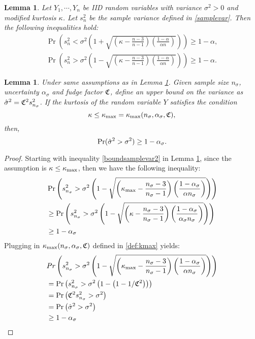 \documentclass{iitthesis}
\newtheorem{lemma}[theorem]{Lemma}
\theoremstyle{definition}
\begin{document}
\begin{lemma}\cite[Lemma 1]{HJLO12} \label{samplevarbound}
Let $Y_1,\cdots,Y_n$ be IID random variables with variance $\sigma^2>0$ and modified kurtosis $\kappa$. Let $s_n^2$ be the sample variance defined in \eqref{samplevar}. Then the following inequalities hold: 
\begin{subequations}
\begin{gather}
\Pr\left( s_n^2 < \sigma^2 \left (1+\sqrt{\left (\kappa-\frac{n-3}{n-1}\right)\left (\frac{1-\alpha}{\alpha n}\right )}\right)\right) \geq 1-\alpha,\label{boundsamplevar1}\\ 
\Pr\left( s_n^2 >\sigma^2 \left (1-\sqrt{\left (\kappa-\frac{n-3}{n-1}\right)\left (\frac{1-\alpha}{\alpha n}\right )}\right)\right) \geq 1-\alpha.\label{boundsamplevar2}
\end{gather}
\end{subequations}

\end{lemma}
\begin{lemma}\label{lowerboundhsigma}
Under same assumptions as in Lemma \ref{samplevarbound}. Given sample size $n_\sigma$, uncertainty $\alpha_\sigma$ and fudge factor $\mathfrak{C}$, define an upper bound on the variance as $\hat{\sigma}^2 = \mathfrak{C}^2 s_{n_{\sigma}}^2$. If the kurtosis of the random variable $Y$ satisfies the condition $$\kappa \leq \kappa_{\max} =\kappa_{\max} (n_\sigma,\alpha_\sigma, \mathfrak{C}),$$ then, $$\Pr (\hat{\sigma}^2 > \sigma^2)\geq 1-\alpha_{\sigma}.$$
\end{lemma}
\begin{proof}
Starting with inequality \eqref{boundsamplevar2} in Lemma \ref{samplevarbound}, since the assumption is $\kappa \leq \kappa_{\max}$, then we have the following inequality: 
\begin{align*}
&\Pr\left( s_{n_{\sigma}}^2 > \sigma^2 \left (1-\sqrt{\left (\kappa_{\max} -\frac{n_{\sigma}-3}{n_{\sigma}-1}\right)\left (\frac{1-\alpha_{\sigma}}{\alpha n_{\sigma}}\right )}\right)\right)\\& \geq\Pr\left( s_{n_{\sigma}}^2 > \sigma^2 \left (1-\sqrt{\left (\kappa-\frac{n_{\sigma}-3}{n_{\sigma}-1}\right)\left (\frac{1-\alpha_{\sigma}}{\alpha_{\sigma} n_{\sigma}}\right )}\right)\right)\\&\geq1-\alpha_{\sigma} 
\end{align*}
 Plugging in $\kappa_{\max}(n_\sigma,\alpha_\sigma, \mathfrak{C})$ defined in \eqref{def:kmax} yields:
 \begin{align*}
&Pr\left( s_{n_{\sigma}}^2 > \sigma^2 \left (1-\sqrt{\left (\kappa_{\max} -\frac{n_{\sigma}-3}{n_{\sigma}-1}\right)\left (\frac{1-\alpha_{\sigma}}{\alpha n_{\sigma}}\right )}\right)\right)\\&
=  \Pr\left( s_{n_{\sigma}}^2 > \sigma^2 \left (1-\left(1-1/\mathfrak{C}^2\right)\right) \right) \\&
=\Pr\left(\mathfrak{C}^2s_{n_{\sigma}}^2  > \sigma^2 \right) \\&
=\Pr\left(\hat{\sigma}^2  > \sigma^2 \right) \\&
\geq  1-\alpha_{\sigma} 
\end{align*}
\end{proof}
\end{document}
